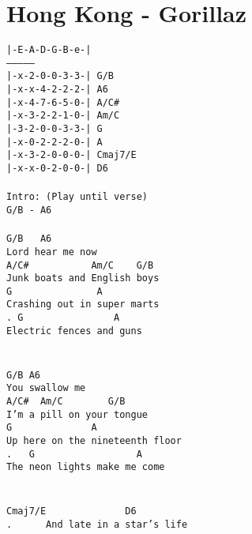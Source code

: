 \newpage
\section{Hong Kong - Gorillaz}
\label{Hong Kong - Gorillaz}
\texttt{|-E-A-D-G-B-e-|\\
---------------\\
|-x-2-0-0-3-3-|\ G/B\ \ \ \\
|-x-x-4-2-2-2-|\ A6\ \ \ \ \\
|-x-4-7-6-5-0-|\ A/C\#\ \ \\
|-x-3-2-2-1-0-|\ Am/C\ \ \\
|-3-2-0-0-3-3-|\ G\ \ \ \ \\
|-x-0-2-2-2-0-|\ A\ \ \ \ \\
|-x-3-2-0-0-0-|\ Cmaj7/E\\
|-x-x-0-2-0-0-|\ D6\\
\\
Intro:\ (Play\ until\ verse)\\
G/B\ -\ A6\\
\\
G/B\ \ \ A6\\
Lord\ hear\ me\ now\\
A/C\#\ \ \ \ \ \ \ \ \ \ \ Am/C\ \ \ \ G/B\\
Junk\ boats\ and\ English\ boys\ \\
G\ \ \ \ \ \ \ \ \ \ \ \ \ \ \ A\\
Crashing\ out\ in\ super\ marts\ \\
.\ G\ \ \ \ \ \ \ \ \ \ \ \ \ \ \ \ A\\
Electric\ fences\ and\ guns\ \\
\\
\\
G/B\ A6\\
You\ swallow\ me\ \\
A/C\#\ \ Am/C\ \ \ \ \ \ \ \ G/B\\
I'm\ a\ pill\ on\ your\ tongue\ \\
G\ \ \ \ \ \ \ \ \ \ \ \ \ \ A\\
Up\ here\ on\ the\ nineteenth\ floor\ \\
.\ \ \ G\ \ \ \ \ \ \ \ \ \ \ \ \ \ \ \ \ \ A\\
The\ neon\ lights\ make\ me\ come\ \\
\\
\\
Cmaj7/E\ \ \ \ \ \ \ \ \ \ \ \ \ \ D6\\
.\ \ \ \ \ \ And\ late\ in\ a\ star's\ life\ \\
}
